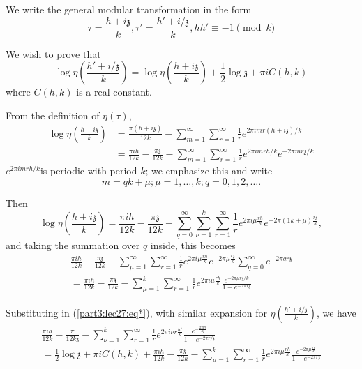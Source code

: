 We write the general modular transformation in the form
$$
\tau = \frac{h+ i \mathfrak{z}}{k}, \tau' = \frac{h' + i
  /\mathfrak{z}}{k}, h h' \equiv -1 \pmod{k}
$$

We wish to prove that
\begin{equation*}
  \log \eta \left( \frac{h' + i/\mathfrak{z}}{k}\right) = \log \eta
  \left(\frac{h+ i \mathfrak{z}}{k} \right) + \frac{1}{2} \log
  \mathfrak{z} + \pi i C(h, k)\tag{*}\label{part3:lec27:eq*}
\end{equation*}
where $C(h, k)$ is a real constant.

From the definition of $\eta (\tau)$, 
\begin{align*}
  \log \eta \left( \frac{h+ i \mathfrak{z}}{k}\right) & = \frac{\pi
    (h+ i \mathfrak{z})}{12k} - \sum^\infty_{m=1} \sum^\infty_{r=1}
  \frac{1}{r} e^{2 \pi i m r (h + i \mathfrak{z})/k}\\
  & = \frac{\pi i h}{12k} - \frac{\pi \mathfrak{z}}{12k} -
    \sum^\infty_{m=1} \sum^\infty_{r=1} \frac{1}{r} e^{2 \pi i m r
      h/k} e^{- 2 \pi m r \mathfrak{z}/k}
\end{align*}
$e^{2 \pi i m r h/k}$\pageoriginale is periodic with period $k$; we emphasize this
and write
$$
m= qk+ \mu; \mu=1, \ldots, k; q=0, 1, 2, \ldots.
$$

Then
$$
\log \eta \left( \frac{h+ i \mathfrak{z}}{k}\right) = \frac{\pi i
  h}{12 k} - \frac{\pi \mathfrak{z}}{12k} - \sum^\infty_{q=0}
\sum^k_{\nu=1} \sum^\infty_{r=1} \frac{1}{r} e^{2 \pi i \mu \frac{r
    h}{k}} e^{- 2 \pi (1 k+ \mu) \frac{r \mathfrak{z}}{k}},
$$
and taking the summation over $q$ inside, this becomes
\begin{multline*}
  \frac{\pi i h}{12k} - \frac{\pi \mathfrak{z}}{12k} -
  \sum^\infty_{\mu=1} \sum^\infty_{r=1} \frac{1}{r} e^{2 \pi i \mu
    \frac{r h}{k}} e^{- 2 \pi \mu \frac{r\mathfrak{z}}{k}}
  \sum^\infty_{q=0} e^{- 2 \pi q r \mathfrak{z}}\\
  = \frac{\pi i h}{12k} - \frac{\pi \mathfrak{z}}{12k} -
  \sum^k_{\mu=1} \sum^\infty_{r=1} \frac{1}{r} e^{2 \pi i \mu \frac{r
      h}{k}} \frac{e^{- 2 \pi \mu r\mathfrak{z}/k}}{1- e^{-2 \pi r \mathfrak{z}}}
\end{multline*}

Substituting in (\ref{part3:lec27:eq*}), with similar expansion for
$\eta \left(\frac{h' + i/\mathfrak{z}}{k}\right)$, we have
\begin{multline*}
  \frac{\pi i h}{12k} - \frac{\pi}{12k \mathfrak{z}} -
  \sum^k_{\nu=1} \sum^\infty_{r=1} \frac{1}{r} e^{2 \pi i \nu r
    \frac{h'}{k}} \frac{e^{-\frac{2 \pi \nu r}{k\mathfrak{z}}}}
  {1-e^{- 2 \pi  r/ \mathfrak{z}}}\\
  = \frac{1}{2} \log \mathfrak{z} + \pi i C(h, k) + \frac{\pi i
    h}{12k} - \frac{\pi 
  \mathfrak{z}}{12k} -\sum^k_{\mu=1} \sum^\infty_{r=1} \frac{1}{r}
  e^{2 \pi i \mu \frac{r h}{k}} \frac{e^{- 2 \pi \mu
      \frac{r\mathfrak{z}}{k}}}{1- e^{-2 \pi r \mathfrak{z}}}  
\end{multline*}

